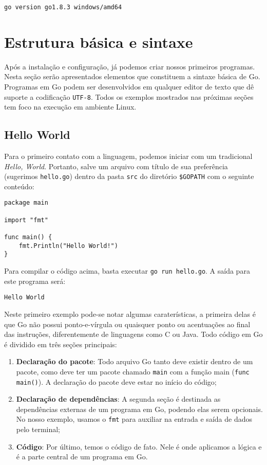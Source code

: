 \documentclass{SBCbookchapter}
\begin{document}
\noindent\texttt{go version go1.8.3 windows/amd64}

\section{Estrutura básica e sintaxe}

Após a instalação e configuração, já podemos criar nossos primeiros programas. Nesta seção serão apresentados elementos que constituem a sintaxe básica de Go. Programas em Go podem ser desenvolvidos em qualquer editor de texto que dê suporte a codificação \texttt{UTF-8}. Todos os exemplos mostrados nas próximas seções tem foco na execução em ambiente Linux.

\subsection{Hello World}

Para o primeiro contato com a linguagem, podemos iniciar com um tradicional \textit{Hello, World}. Portanto, salve um arquivo com título de sua preferência (sugerimos \texttt{hello.go}) dentro da pasta \texttt{src} do diretório \texttt{\$GOPATH} com o seguinte conteúdo:

\begin{lstlisting}
package main

import "fmt"

func main() {
    fmt.Println("Hello World!")
}
\end{lstlisting}

Para compilar o código acima, basta executar \texttt{go run hello.go}. A saída para este programa será:

\texttt{Hello World}

Neste primeiro exemplo pode-se notar algumas caraterísticas, a primeira delas é que Go não possui ponto-e-vírgula ou quaisquer ponto ou acentuações ao final das instruções, diferentemente de linguagens como C ou Java. Todo código em Go é dividido em três seções principais: 

\begin{enumerate}
	\item \textbf{Declaração do pacote}: Todo arquivo Go tanto deve existir dentro de um pacote, como deve ter um pacote chamado \texttt{main} com a função main (\texttt{func main()}). A declaração do pacote deve estar no início do código;
	\item \textbf{Declaração de dependências}: A segunda seção é destinada as dependências externas de um programa em Go, podendo elas serem opcionais. No nosso exemplo, usamos o \texttt{fmt} para auxiliar na entrada e saída de dados pelo terminal;
	\item \textbf{Código}: Por último, temos o código de fato. Nele é onde aplicamos a lógica e é a parte central de um programa em Go.
\end{enumerate}
\end{document}
